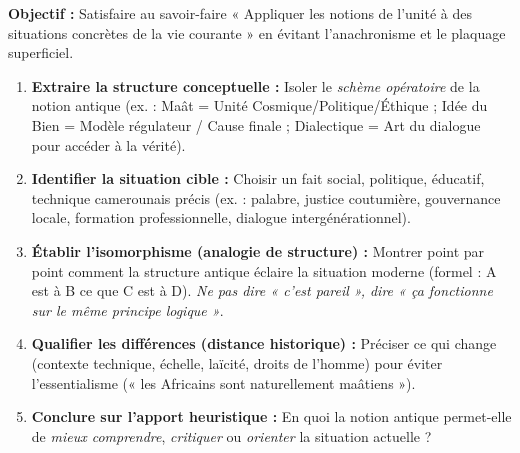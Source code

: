 \documentclass[11pt]{article}
\begin{document}
\begin{methode}
\textbf{Objectif :} Satisfaire au savoir-faire « Appliquer les notions de l'unité à des situations concrètes de la vie courante » en évitant l'anachronisme et le plaquage superficiel.
\begin{enumerate}
    \item \textbf{Extraire la structure conceptuelle :} Isoler le \emph{schème opératoire} de la notion antique (ex. : Maât = Unité Cosmique/Politique/Éthique ; Idée du Bien = Modèle régulateur / Cause finale ; Dialectique = Art du dialogue pour accéder à la vérité).
    \item \textbf{Identifier la situation cible :} Choisir un fait social, politique, éducatif, technique camerounais précis (ex. : palabre, justice coutumière, gouvernance locale, formation professionnelle, dialogue intergénérationnel).
    \item \textbf{Établir l'isomorphisme (analogie de structure) :} Montrer point par point comment la structure antique éclaire la situation moderne (formel : A est à B ce que C est à D). \emph{Ne pas dire « c'est pareil », dire « ça fonctionne sur le même principe logique »}.
    \item \textbf{Qualifier les différences (distance historique) :} Préciser ce qui change (contexte technique, échelle, laïcité, droits de l'homme) pour éviter l'essentialisme (« les Africains sont naturellement maâtiens »).
    \item \textbf{Conclure sur l'apport heuristique :} En quoi la notion antique permet-elle de \emph{mieux comprendre}, \emph{critiquer} ou \emph{orienter} la situation actuelle ?
\end{enumerate}
\end{methode}
\end{document}
